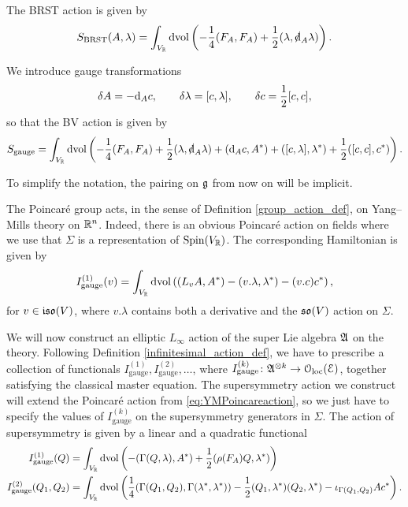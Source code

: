 \documentclass[10pt, oneside]{article}
\newcommand{\gauge}{\mathrm{gauge}}
\begin{document}
The BRST action is given by
\[S_{\mr{BRST}}(A, \lambda) = \int_{V_\RR}\dvol \left( -\frac{1}{4} (F_A, F_A) + \frac{1}{2}(\lambda, \sd \d_A \lambda)\right).\]

We introduce gauge transformations
\[\delta A = -{\rm d}_A c,\qquad \delta \lambda = [c, \lambda],\qquad \delta c = \frac{1}{2}[c, c],\]
so that the BV action is given by
\begin{equation}
S_{\gauge} = \int_{V_\RR}\dvol \left( -\frac{1}{4} (F_A, F_A) + \frac{1}{2}(\lambda, \sd\d_A \lambda) + (\d_A c, A^*) + ([c, \lambda], \lambda^*) + \frac{1}{2}([c, c], c^*)\right).
\label{eq:YMBVaction}
\end{equation}

To simplify the notation, the pairing on $\mathfrak g$ from now on will be implicit.

The Poincar\'e group acts, in the sense of Definition \ref{group_action_def}, on Yang--Mills theory on $\mathbb R^n$. Indeed, there is an obvious Poincar\'e action on fields where we use that $\Sigma$ is a representation of $\mathrm{Spin}(V_\mathbb R)$. The corresponding Hamiltonian is given by
\begin{equation}
I_{\gauge}^{(1)}(v) = \int_{V_\RR}\dvol\left( (L_{v}A, A^*) - (v.\lambda, \lambda^*) - (v.c)c^*\right),
\label{eq:YMPoincareaction}
\end{equation}
for $v\in\mathfrak{iso}(V)$, where $v.\lambda$ contains both a derivative and the $\mathfrak{so}(V)$ action on $\Sigma$.

We will now construct an elliptic $L_\infty$ action of the super Lie algebra $\mathfrak{A}$ on the theory. Following Definition \ref{infinitesimal_action_def}, we have to prescribe a collection of functionals $I_{\gauge}^{(1)}, I_{\gauge}^{(2)}, \dots$, where $I_{\gauge}^{(k)}\colon \mf{A}^{\otimes k}\rightarrow \oloc(\cE)$, together satisfying the classical master equation. The supersymmetry action we construct will extend the Poincar\'{e} action from \eqref{eq:YMPoincareaction}, so we just have to specify the values of $I_{\gauge}^{(k)}$ on the supersymmetry generators in $\Sigma$. The action of supersymmetry is given by a linear and a quadratic functional
\begin{align}
I_{\gauge}^{(1)}(Q) &= \int_{V_\RR}\dvol\left( -(\Gamma(Q, \lambda), A^*) + \frac{1}{2}(\rho(F_A)Q, \lambda^*)\right) \label{eq:gaugeI1} \\
I_{\gauge}^{(2)}(Q_1, Q_2) &= \int_{V_\RR}\dvol\left( \frac{1}{4}(\Gamma(Q_1, Q_2), \Gamma(\lambda^*, \lambda^*)) - \frac{1}{2}(Q_1, \lambda^*)(Q_2, \lambda^*) - \iota_{\Gamma(Q_1, Q_2)} A c^*\right). \label{eq:gaugeI2}
\end{align}
\end{document}
